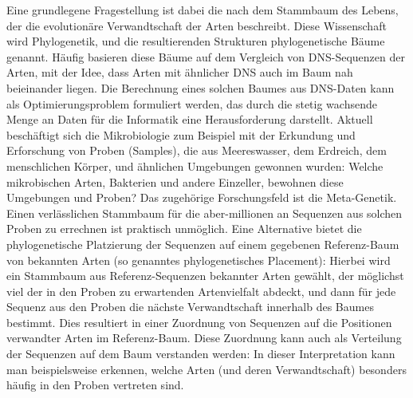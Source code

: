 Eine grundlegene Fragestellung ist dabei die nach dem Stammbaum des Lebens,
der die evolution\"are Verwandtschaft der Arten beschreibt.
Diese Wissenschaft wird Phylogenetik, und die resultierenden Strukturen phylogenetische B\"aume genannt.
H\"aufig basieren diese B\"aume auf dem Vergleich von DNS-Sequenzen der Arten,
mit der Idee, dass Arten mit \"ahnlicher DNS auch im Baum nah beieinander liegen.
Die Berechnung eines solchen Baumes aus DNS-Daten kann als Optimierungsproblem formuliert werden,
das durch die stetig wachsende Menge an Daten f\"ur die Informatik eine Herausforderung darstellt.
Aktuell besch\"aftigt sich die Mikrobiologie zum Beispiel mit der Erkundung und Erforschung von Proben (Samples),
die aus Meereswasser, dem Erdreich, dem menschlichen K\"orper, und \"ahnlichen Umgebungen gewonnen wurden:
Welche mikrobischen Arten, Bakterien und andere Einzeller, bewohnen diese Umgebungen und Proben?
Das zugeh\"orige Forschungsfeld ist die Meta-Genetik.
Einen verl\"asslichen Stammbaum f\"ur die aber-millionen an Sequenzen aus solchen Proben zu errechnen
ist praktisch unm\"oglich.
Eine Alternative bietet die phylogenetische Platzierung der Sequenzen auf einem gegebenen Referenz-Baum von bekannten Arten
(so genanntes phylogenetisches Placement):
Hierbei wird ein Stammbaum aus Referenz-Sequenzen bekannter Arten gew\"ahlt,
der m\"oglichst viel der in den Proben zu erwartenden Artenvielfalt abdeckt,
und dann f\"ur jede Sequenz aus den Proben die n\"achste Verwandtschaft innerhalb des Baumes bestimmt.
Dies resultiert in einer Zuordnung von Sequenzen auf die Positionen verwandter Arten im Referenz-Baum.
Diese Zuordnung kann auch als Verteilung der Sequenzen auf dem Baum verstanden werden:
In dieser Interpretation kann man beispielsweise erkennen,
welche Arten (und deren Verwandtschaft) besonders h\"aufig in den Proben vertreten sind.

